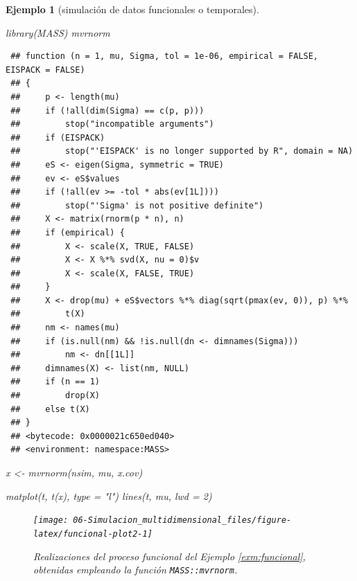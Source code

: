 \documentclass[
  10pt,
]{book}
\newenvironment{Shaded}{\begin{snugshade}}{\end{snugshade}}
\newcommand{\AttributeTok}[1]{\textcolor[rgb]{0.77,0.63,0.00}{#1}}
\newcommand{\DecValTok}[1]{\textcolor[rgb]{0.00,0.00,0.81}{#1}}
\newcommand{\FunctionTok}[1]{\textcolor[rgb]{0.00,0.00,0.00}{#1}}
\newcommand{\NormalTok}[1]{#1}
\newcommand{\OtherTok}[1]{\textcolor[rgb]{0.56,0.35,0.01}{#1}}
\newcommand{\StringTok}[1]{\textcolor[rgb]{0.31,0.60,0.02}{#1}}
\theoremstyle{break}
\newtheorem{example}{Ejemplo}[chapter]
\theoremstyle{nonumberplain}
\begin{document}
\begin{example}[simulación de datos funcionales o temporales]
\begin{Shaded}
\begin{Highlighting}[]
\FunctionTok{library}\NormalTok{(MASS)}
\NormalTok{mvrnorm}
\end{Highlighting}
\end{Shaded}

\begin{verbatim}
 ## function (n = 1, mu, Sigma, tol = 1e-06, empirical = FALSE, EISPACK = FALSE) 
 ## {
 ##     p <- length(mu)
 ##     if (!all(dim(Sigma) == c(p, p))) 
 ##         stop("incompatible arguments")
 ##     if (EISPACK) 
 ##         stop("'EISPACK' is no longer supported by R", domain = NA)
 ##     eS <- eigen(Sigma, symmetric = TRUE)
 ##     ev <- eS$values
 ##     if (!all(ev >= -tol * abs(ev[1L]))) 
 ##         stop("'Sigma' is not positive definite")
 ##     X <- matrix(rnorm(p * n), n)
 ##     if (empirical) {
 ##         X <- scale(X, TRUE, FALSE)
 ##         X <- X %*% svd(X, nu = 0)$v
 ##         X <- scale(X, FALSE, TRUE)
 ##     }
 ##     X <- drop(mu) + eS$vectors %*% diag(sqrt(pmax(ev, 0)), p) %*% 
 ##         t(X)
 ##     nm <- names(mu)
 ##     if (is.null(nm) && !is.null(dn <- dimnames(Sigma))) 
 ##         nm <- dn[[1L]]
 ##     dimnames(X) <- list(nm, NULL)
 ##     if (n == 1) 
 ##         drop(X)
 ##     else t(X)
 ## }
 ## <bytecode: 0x0000021c650ed040>
 ## <environment: namespace:MASS>
\end{verbatim}

\begin{Shaded}
\begin{Highlighting}[]
\NormalTok{x }\OtherTok{\textless{}{-}} \FunctionTok{mvrnorm}\NormalTok{(nsim, mu, x.cov)}

\FunctionTok{matplot}\NormalTok{(t, }\FunctionTok{t}\NormalTok{(x), }\AttributeTok{type =} \StringTok{"l"}\NormalTok{)}
\FunctionTok{lines}\NormalTok{(t, mu, }\AttributeTok{lwd =} \DecValTok{2}\NormalTok{)}
\end{Highlighting}
\end{Shaded}

\begin{figure}[!htbp]

{\centering \texttt{[image: 06-Simulacion\_multidimensional\_files/figure-latex/funcional-plot2-1]} 

}

\caption{Realizaciones del proceso funcional del Ejemplo \ref{exm:funcional}, obtenidas empleando la función \texttt{MASS::mvrnorm}.}\label{fig:funcional-plot2}
\end{figure}

\end{example}
\end{document}
